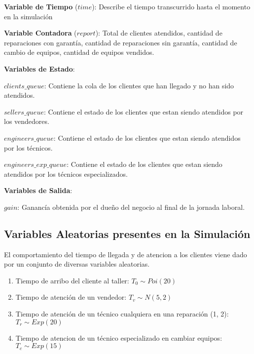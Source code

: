 \documentclass[a4paper,10pt,twocolumn]{article}
\begin{document}
	\begin{description}
		\item \textbf{Variable de Tiempo} ($time$): Describe el tiempo transcurrido hasta el momento en la simulación
		\item \textbf{Variable Contadora} ($report$): Total de clientes atendidos, cantidad de reparaciones con garantía, cantidad de reparaciones sin garantía, cantidad de cambio de equipos, cantidad de equipos vendidos.
		\item \textbf{Variables de Estado}:
		\begin{description}
			\item $clients\_queue$: Contiene la cola de los clientes que han llegado y no han sido atendidos.
			\item $sellers\_queue$: Contiene el estado de los clientes que estan siendo atendidos por los vendedores.
			\item $engineers\_queue$: Contiene el estado de los clientes que estan siendo atendidos por los técnicos.
			\item $engineers\_exp\_queue$: Contiene el estado de los clientes que estan siendo atendidos por los técnicos especializados.
			
		\end{description}
		\item \textbf{Variables de Salida}:
		\begin{description}
			\item $gain$: Ganancía obtenida por el dueño del negocio al final de la jornada laboral.
		\end{description}
	\end{description}
	\subsection{Variables Aleatorias presentes en la Simulaci\'on}\label{sub:lists}
		
		El comportamiento del tiempo de llegada y de atencion a los clientes viene dado por un conjunto de diversas variables aleatorias.
		
		\begin{enumerate}
			\item Tiempo de arribo del cliente al taller: $T_{0} \sim  Poi(20)$
			\item Tiempo de atención de un vendedor: $T_{v} \sim N(5,2)$
			\item Tiempo de atención de un técnico cualquiera en una reparación (1, 2): $T_{r} \sim Exp(20)$
			\item Tiempo de atencion de un técnico especializado en cambiar equipos: $T_{c} \sim Exp(15)$
		\end{enumerate}
\end{document}
